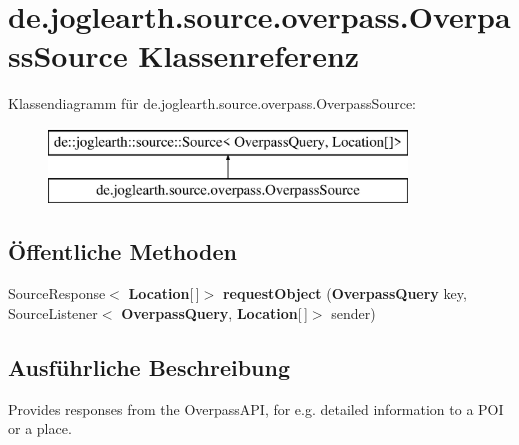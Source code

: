\section{de.\-joglearth.\-source.\-overpass.\-Overpass\-Source Klassenreferenz}
\label{classde_1_1joglearth_1_1source_1_1overpass_1_1_overpass_source}
Klassendiagramm für de.\-joglearth.\-source.\-overpass.\-Overpass\-Source\-:\begin{figure}[H]
\begin{center}
\leavevmode
\includegraphics[height=2.000000cm]{classde_1_1joglearth_1_1source_1_1overpass_1_1_overpass_source}
\end{center}
\end{figure}
\subsection*{Öffentliche Methoden}
\begin{DoxyCompactItemize}
\item 
Source\-Response$<$ {\bf Location}[$\,$]$>$ {\bfseries request\-Object} ({\bf Overpass\-Query} key, Source\-Listener$<$ {\bf Overpass\-Query}, {\bf Location}[$\,$]$>$ sender)\label{classde_1_1joglearth_1_1source_1_1overpass_1_1_overpass_source_a95145695b397d6c3e87d06d7fbec9bfb}

\end{DoxyCompactItemize}


\subsection{Ausführliche Beschreibung}
Provides responses from the Overpass\-A\-P\-I, for e.\-g. detailed information to a P\-O\-I or a place. 